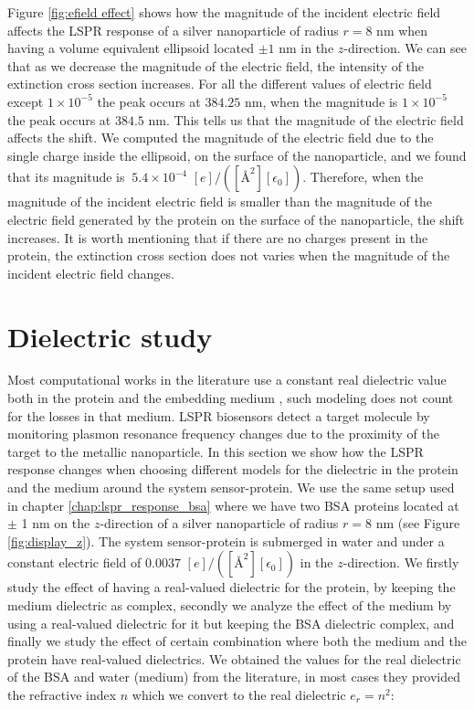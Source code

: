 Figure \ref{fig:efield effect} shows how the magnitude of the incident electric field affects the LSPR response 
of a silver nanoparticle of radius $r=8$ nm when having a volume equivalent ellipsoid located 
$\pm 1$ nm in the $z$-direction. We can see that as we decrease the magnitude of the electric field, 
the intensity of the extinction cross section increases. For all the different values of electric field except 
$1\times10^{-5}$ the peak occurs at $384.25$ nm, when the magnitude is $1\times10^{-5}$ the peak occurs at 
$384.5$ nm. This tells us that the magnitude of the electric field affects the shift. We computed 
the magnitude of the electric field due to the single charge inside the ellipsoid, on the surface of the nanoparticle,
and we found that its magnitude is $~5.4 \times 10^{-4}$ $[e]/([{\text{\AA}}^2][\epsilon_0])$. Therefore, 
when the magnitude of the incident electric field is smaller than the magnitude of the electric field generated by 
the protein on the surface of the nanoparticle, the shift increases. It is worth mentioning that if there are no charges 
present in the protein, the extinction cross section does not varies when the magnitude of the incident electric field 
changes. 


\section{Dielectric study}

Most computational works in the literature use a constant real dielectric value both in the protein and the
embedding medium \cite{NghiemETal2012, SantiagoCordobaETal2011,UngerETal2009}, such modeling does not count for the losses 
in that medium. LSPR biosensors detect a target molecule by monitoring plasmon resonance frequency changes due to the proximity 
of the target to the metallic nanoparticle. In this section we show how the LSPR response changes when choosing different models 
for the dielectric in the protein and the medium around the system sensor-protein. We use the same setup used in chapter \ref{chap:lspr_response_bsa}
where we have two BSA proteins located at $\pm$ 1 nm on the $z$-direction of a silver nanoparticle of radius $r=8$ nm (see 
Figure \ref{fig:display_z}). The system sensor-protein is submerged in water and under a constant electric field of 
$0.0037$ $[e]/([{\text{\AA}}^2][\epsilon_0])$ in the $z$-direction. We firstly study the effect of having a real-valued dielectric 
for the protein, by keeping the medium dielectric as complex, secondly we analyze the effect of the medium by using a real-valued 
dielectric for it but keeping the BSA dielectric complex, and finally we study the effect of certain combination where both the medium 
and the protein have real-valued dielectrics. We obtained the values for the real dielectric of the BSA and water (medium) from the literature,
in most cases they provided the refractive index $n$ which we convert to the real dielectric $e_r=n^2$:  

